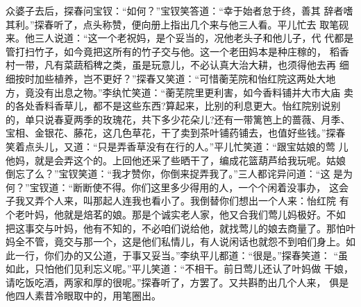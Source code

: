众婆子去后，探春问宝钗：“如何？”宝钗笑答道：“幸于始者怠于终，善其
辞者嗜其利。”探春听了，点头称赞，便向册上指出几个来与他三人看。平儿忙去
取笔砚来。他三人说道：“这一个老祝妈，是个妥当的，况他老头子和他儿子，代
代都是管打扫竹子，如今竟把这所有的竹子交与他。这一个老田妈本是种庄稼的，
稻香村一带，凡有菜蔬稻稗之类，虽是玩意儿，不必认真大治大耕，也须得他去再
细细按时加些植养，岂不更好？”探春又笑道：“可惜蘅芜院和怡红院这两处大地
方，竟没有出息之物。”李纨忙笑道：“蘅芜院里更利害，如今香料铺并大市大庙
卖的各处香料香草儿，都不是这些东西?算起来，比别的利息更大。怡红院别说别
的，单只说春夏两季的玫瑰花，共下多少花朵儿?还有一带篱笆上的蔷薇、月季、
宝相、金银花、藤花，这几色草花，干了卖到茶叶铺药铺去，也值好些钱。”探春
笑着点头儿，又道：“只是弄香草没有在行的人。”平儿忙笑道：“跟宝姑娘的莺
儿他妈，就是会弄这个的。上回他还采了些晒干了，编成花篮葫芦给我玩呢。姑娘
倒忘了么？”宝钗笑道：“我才赞你，你倒来捉弄我了。”三人都诧异问道：“这
是为何？”宝钗道：“断断使不得。你们这里多少得用的人，一个个闲着没事办，
这会子我又弄个人来，叫那起人连我也看小了。我倒替你们想出一个人来：怡红院
有个老叶妈，他就是焙茗的娘。那是个诚实老人家，他又合我们莺儿妈极好。不如
把这事交与叶妈，他有不知的，不必咱们说给他，就找莺儿的娘去商量了。那怕叶
妈全不管，竟交与那一个，这是他们私情儿，有人说闲话也就怨不到咱们身上。如
此一行，你们办的又公道，于事又妥当。”李纨平儿都道：“很是。”探春笑道：
“虽如此，只怕他们见利忘义呢。”平儿笑道：“不相干。前日莺儿还认了叶妈做
干娘，请吃饭吃酒，两家和厚的很呢。”探春听了，方罢了。又共斟酌出几个人来，
俱是他四人素昔冷眼取中的，用笔圈出。

